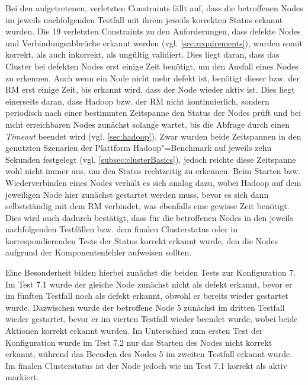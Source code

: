 Bei den aufgetretenen, verletzten Constraints fällt auf, dass die betroffenen Nodes im jeweils nachfolgenden Testfall mit ihrem jeweils korrekten Status erkannt wurden.
Die 19 verletzten Constraints zu den Anforderungen, dass defekte Nodes und Verbindungsabbrüche erkannt werden (vgl. \cref{sec:requirements}), wurden somit korrekt, als auch inkorrekt, als ungültig validiert.
Dies liegt daran, dass das Cluster bei defekten Nodes erst einige Zeit benötigt, um den Ausfall eines Nodes zu erkennen.
Auch wenn ein Node nicht mehr defekt ist, benötigt dieser bzw. der \gls{RM} erst einige Zeit, bis erkannt wird, dass der Node wieder aktiv ist.
Dies liegt einerseits daran, dass Hadoop bzw. der \gls{RM} nicht kontinuierlich, sondern periodisch nach einer bestimmten Zeitspanne den Status der Nodes prüft und bei nicht erreichbaren Nodes zunächst solange wartet, bis die Abfrage durch einen \emph{Timeout} beendet wird (vgl. \cref{sec:hadoop}).
Zwar wurden beide Zeitspannen in den genutzten Szenarien der Plattform Hadoop"=Benchmark auf jeweils zehn Sekunden festgelegt (vgl. \cref{subsec:clusterBasics}), jedoch reichte diese Zeitspanne wohl nicht immer aus, um den Status rechtzeitig zu erkennen.
Beim Starten bzw. Wiederverbinden eines Nodes verhält es sich analog dazu, wobei Hadoop auf dem jeweiligen Node hier zunächst gestartet werden muss, bevor es sich dann selbstständig mit dem \gls{RM} verbindet, was ebenfalls eine gewisse Zeit benötigt.
Dies wird auch dadurch bestätigt, dass für die betroffenen Nodes in den jeweils nachfolgenden Testfällen bzw. dem finalen Clusterstatus oder in korrespondierenden Tests der Status korrekt erkannt wurde, den die Nodes aufgrund der Komponentenfehler aufweisen sollten.

Eine Besonderheit bilden hierbei zunächst die beiden Tests zur Konfiguration 7.
Im Test 7.1 wurde der gleiche Node zunächst nicht als defekt erkannt, bevor er im fünften Testfall noch als defekt erkannt, obwohl er bereits wieder gestartet wurde.
Dazwischen wurde der betroffene Node 5 zunächst im dritten Testfall wieder gestartet, bevor er im vierten Testfall wieder beendet wurde, wobei beide Aktionen korrekt erkannt wurden.
Im Unterschied zum ersten Test der Konfiguration wurde im Test 7.2 nur das Starten des Nodes nicht korrekt erkannt, während das Beenden des Nodes 5 im zweiten Testfall erkannt wurde.
Im finalen Clusterstatus ist der Node jedoch wie im Test 7.1 korrekt als aktiv markiert.

